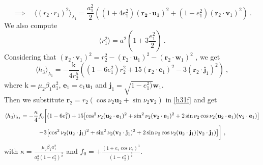 \documentclass[a4paper]{article}
\begin{document}
\begin{equation}
\implies
\quad
 \langle (r_{2} \cdot r_{1})^{2} \rangle _{\lambda_{1}}=\frac{a_{1}^{2}}{2}((1+4e_{1}^{2})(\mathbf{r_{2} \cdot u_{1}})^{2}+(1-e_{1}^{2})(\mathbf r_{2} \cdot \mathbf v_{1})^{2}) \ .
\end{equation}
We also compute
\begin{equation}
 \langle r_{1}^{2} \rangle =a^{2}(1+3\frac{e_{1}^{2}}{2}) \ .
\end{equation}
Considering that $(\mathbf r_{2} \cdot \mathbf v_{1})^{2}=r_{2}^{2}-(\mathbf r_{2} \cdot \mathbf u_{1})^{2}-(\mathbf r_{2} \cdot \mathbf w_{1})^{2}$ , we get 
\begin{equation}
 \langle h_{3} \rangle _{\lambda_{1}} = -\frac{\mathrm k}{4r_{2}^{5}}((1-6e_{1}^{2})r_{2}^{2}
+15(\mathbf r_{2} \cdot \mathbf e_{1})^{2}-3(\mathbf r_{2} \cdot \mathbf j_{1})^{2}) \ ,
\label{h31f}
\end{equation}
where $\mathrm k=\mu_{2}\beta_{1}a_{1}^{2}$, \; $\mathbf e_{1}=e_{1}\mathbf u_{1}$ and $\mathbf j_{1}=\sqrt{1-e_{1}^{2})}\mathbf w_{1}$. \\
Then we substitute $\mathbf r_{2}=r_{2} \left( \cos{\nu_{2}} \mathbf u_{2} + \sin{\nu_{2}} \mathbf v_{2} \right)$ in \eqref{h31f} and get
 \begin{gather}
 \langle h_{3} \rangle _{\lambda_{1}} = -\frac{\kappa}{4}f_{0} 
\biggl[ (1-6e_{1}^{2})
 +15\bigl[ \cos^{2}{\nu_{2}} (\mathbf u_{2} \cdot \mathbf e_{1})^{2}+\sin^{2}{\nu_{2}} (\mathbf v_{2} \cdot \mathbf e_{1})^{2}+2\sin{\nu_{2}}\cos{\nu_{2}}(\mathbf u_{2} \cdot \mathbf e_{1})(\mathbf v_{2} \cdot \mathbf e_{1}) \bigr]   \notag \\
-3\bigl[ \cos^{2}{\nu_{2}} (\mathbf u_{2} \cdot \mathbf j_{1})^{2}+\sin^{2}{\nu_{2}} (\mathbf v_{2} \cdot \mathbf j_{1})^{2}+2\sin{\nu_{2}}\cos{\nu_{2}}(\mathbf u_{2} \cdot \mathbf j_{1})(\mathbf v_{2} \cdot \mathbf j_{1}) \bigr]
\biggr] \ ,
 \label{h312f}
\end{gather}
with $\kappa=\frac{\mu_{2}\beta_{1}a_{1}^{2}}{a_{2}^{3}(1-e_{2}^{2})^\frac{3}{2}}$ and $f_{0}=+\frac{(1+e_{2}\cos{\nu_{2}})^{3}}{(1-e_{2}^{2})^{\frac{3}{2}}}$.
\end{document}
